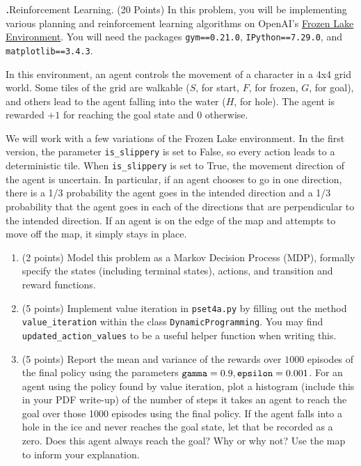 \documentclass[12pt]{amsart}
\newenvironment{statement}[1]{\smallskip\noindent\color[rgb]{0.0,0.0,0.0} {\bf #1.}}{}
\newcommand{\1}{\mathds{1}}
\begin{document}
\newpage
\begin{statement}{2} \textit{Reinforcement Learning.} (20 Points) 
 In this problem, you will be implementing various planning and reinforcement learning algorithms on OpenAI's \href{https://gym.openai.com/envs/FrozenLake-v0/}{Frozen Lake Environment}. 
You will need the packages \texttt{gym==0.21.0}, \texttt{IPython==7.29.0}, and 
\texttt{matplotlib==3.4.3}.

In this environment, an agent controls the movement of a character in a 4x4 grid world. Some tiles of the grid are walkable ($S$, for start, $F$, for frozen, $G$, for goal), and others lead to the agent falling into the water ($H$, for hole). The agent is rewarded $+1$ for reaching the goal state and $0$ otherwise. 

We will work with a few variations of the Frozen Lake environment. In the first version, the parameter \verb|is_slippery| is set to False, so every action leads to a deterministic tile. When \verb|is_slippery| is set to True, the movement direction of the agent is uncertain. In particular, if an agent chooses to go in one direction, there is a 1/3 probability the agent goes in the intended direction and a 1/3 probability that the agent goes in each of the directions that are perpendicular to the intended direction. If an agent is on the edge of the map and attempts to move off the map, it simply stays in place.

\begin{enumerate}
    \item (2 points) Model this problem as a Markov Decision Process (MDP), formally specify the states (including terminal states), actions, and transition and reward functions.
    
    \item (5 points) Implement value iteration in \texttt{pset4a.py} by filling out the method \verb|value_iteration| within the class \verb|DynamicProgramming|. You may find \verb|updated_action_values| to be a useful helper function when writing this.
    
    \item (5 points) Report the mean and variance of the rewards over $1000$ episodes of the final policy using the parameters $\verb|gamma|=0.9, \verb|epsilon|=0.001$. For an agent using the policy found by value iteration, plot a histogram (include this in your PDF write-up) of the number of steps it takes an agent to reach the goal over those 1000 episodes using the final policy. If the agent falls into a hole in the ice and never reaches the goal state, let that be recorded as a zero. Does this agent always reach the goal? Why or why not? Use the map to inform your explanation.
    

\end{enumerate}
\end{statement}
\end{document}
